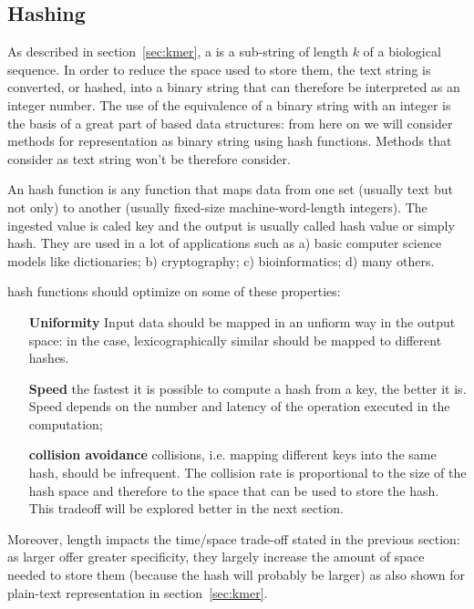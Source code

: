 \subsection{Hashing \kmers}
As described in section~\ref{sec:kmer}, a \kmer is a sub-string of length $k$ of a biological sequence. In order to reduce the space used to store them, the text string is converted, or hashed, into a binary string that can therefore be interpreted as an integer number. The use of the equivalence of a binary string with an integer is the basis of a great part of \kmer based data structures: from here on we will consider methods for \kmers representation as binary string using hash functions. Methods that consider \kmer as text string won't be therefore consider.
\begin{description}
	\item An hash function is any function that maps data from one set (usually text but not only) to another (usually fixed-size machine-word-length integers). The ingested value is caled key and the output is usually called hash value or simply hash. They are used in a lot of applications such as a) basic computer science models like dictionaries; b) cryptography; c) bioinformatics; d) many others.
	\item hash functions should optimize on some of these properties:
	\begin{itemize}
		\item[\textbf{Uniformity}] Input data should be mapped in an unfiorm way in the output space: in the \kmer case, lexicographically similar \kmers should be mapped to different hashes.
		\item[\textbf{Speed}] the fastest it is possible to compute a hash from a key, the better it is. Speed depends on the number and latency of the operation executed in the computation;
		\item[\textbf{collision avoidance}] collisions, i.e. mapping different keys into the same hash, should be infrequent. The collision rate is proportional to the size of the hash space and therefore to the space that can be used to store the hash. This tradeoff will be explored better in the next section.
	\end{itemize}
\end{description}
Moreover, \kmer length impacts the time/space trade-off stated in the previous section: as larger \kmer offer greater specificity, they largely increase the amount of space needed to store them (because the hash will probably be larger) as also shown for plain-text representation in section~\ref{sec:kmer}.


